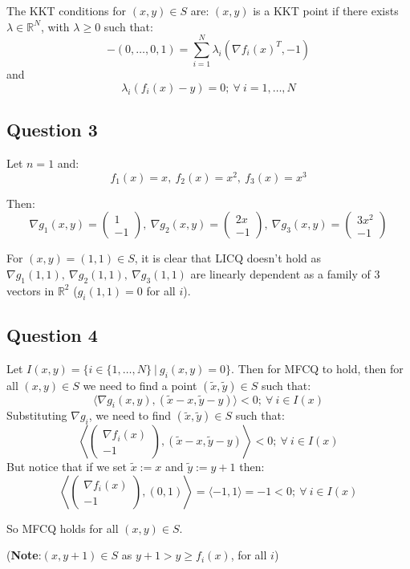 \documentclass[12p]{article}
\begin{document}
The KKT conditions for \((x,y)\in S\) are: \((x,y)\) is a KKT point if there exists \(\lambda\in\mathbb{R}^N\), with \(\lambda\geq0\) such that:
\[
    -(0,\dots,0,1)=   \sum_{i=1}^{N}\lambda_i(\nabla f_i(x)^T,-1)    
\]
and
\[
    \lambda_i(f_i(x)-y)=0;\ \forall\ i=1,\dots,N  
\]
\subsection*{Question 3}\hfil\par
Let \(n=1\) and:
\[
    f_1(x)=x,\ f_2(x)=x^2,\ f_3(x)=x^3
\]

Then:
\[
  \nabla g_1(x,y)=\begin{pmatrix}
    1\\
     -1
    \end{pmatrix},\ \nabla g_2(x,y)=\begin{pmatrix}
    2x\\
     -1
    \end{pmatrix},\ \nabla g_3(x,y)=\begin{pmatrix}
    3x^2\\
     -1
    \end{pmatrix}
\]

For \((x,y)=(1,1)\in S\), it is clear that LICQ doesn't hold as \(\nabla g_1(1,1),\ \nabla g_2(1,1),\ \nabla g_3(1,1)\) are linearly dependent as a family of 3 vectors in \(\mathbb{R}^2\) (\(g_i(1,1)=0\) for all \(i\)).

\subsection*{Question 4}\hfil\par
Let \(I(x,y)=\{i\in\{1,\dots ,N\}\ |\ g_i(x,y)=0\}\). Then for MFCQ to hold, then for all \((x,y)\in S\) we need to find a point \((\tilde x, \tilde y)\in S\) such that:
\[
  \langle \nabla g_i(x,  y), (\tilde x- x, \tilde y-y)\rangle<0;\ \forall\ i\in I(x)
\]
Substituting \(\nabla g_i\), we need to find \((\tilde x, \tilde y)\in S\) such that:
\[
    \left\langle \begin{pmatrix}
        \nabla f_i(x)\\
         -1
        \end{pmatrix}    , (\tilde x- x, \tilde y-y)\right\rangle<0;\ \forall\ i\in I(x)
\]
But notice that if we set \(\tilde x:=x\) and \(\tilde y:=y+1\) then:
\[
    \left\langle \begin{pmatrix}
        \nabla f_i(x)\\
         -1
        \end{pmatrix}    , (0, 1)\right\rangle=\langle-1,1\rangle=-1<0;\ \forall\ i\in I(x)
\]

So MFCQ holds for all \((x,y)\in S\).

(\textbf{Note}:\((x,y+1)\in S\) as \(y+1>y\geq f_i(x)\), for all \(i\))
\end{document}

